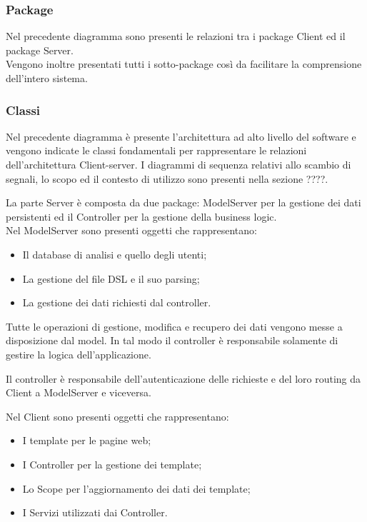 \subsubsection{Package}
Nel precedente diagramma sono presenti le relazioni tra i package Client ed il package Server.\\
Vengono inoltre presentati tutti i sotto-package così da facilitare la comprensione dell'intero sistema.

\subsubsection{Classi}
Nel precedente diagramma è presente l'architettura ad alto livello del software e vengono indicate le classi fondamentali per rappresentare le relazioni dell'architettura Client-server. I diagrammi di sequenza relativi allo scambio di segnali, lo scopo ed il contesto di utilizzo sono presenti nella sezione ????.

La parte Server è composta da due package: ModelServer per la gestione dei dati persistenti ed il Controller per la gestione della business logic.\\
Nel ModelServer sono presenti oggetti che rappresentano:
\begin{itemize}
\item Il database di analisi e quello degli utenti;
\item La gestione del file DSL e il suo parsing;
\item La gestione dei dati richiesti dal controller.
\end{itemize}
Tutte le operazioni di gestione, modifica e recupero dei dati vengono messe a disposizione dal model. In tal modo il controller è responsabile solamente di gestire la logica dell'applicazione.

Il controller è responsabile dell'autenticazione delle richieste e del loro routing da Client a ModelServer e viceversa.

Nel Client sono presenti oggetti che rappresentano:
\begin{itemize}
\item I template per le pagine web;
\item I Controller per la gestione dei template;
\item Lo Scope per l'aggiornamento dei dati dei template;
\item I Servizi utilizzati dai Controller.
\end{itemize}


